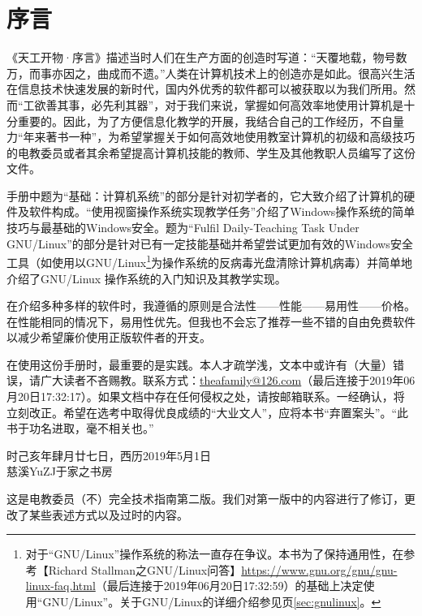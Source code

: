 \chapter{序言}
《天工开物·序言》描述当时人们在生产方面的创造时写道：“天覆地载，物号数万，而事亦因之，曲成而不遗。”人类在计算机技术上的创造亦是如此。很高兴生活在信息技术快速发展的新时代，国内外优秀的软件都可以被获取以为我们所用。然而“工欲善其事，必先利其器”，对于我们来说，掌握如何高效率地使用计算机是十分重要的。因此，为了方便信息化教学的开展，我结合自己的工作经历，不自量力“年来著书一种”，为希望掌握关于如何高效地使用教室计算机的初级和高级技巧的电教委员或者其余希望提高计算机技能的教师、学生及其他教职人员编写了这份文件。\par
手册中题为“基础：计算机系统”的部分是针对初学者的，它大致介绍了计算机的硬件及软件构成。“使用视窗操作系统实现教学任务”介绍了Windows操作系统的简单技巧与最基础的Windows安全。题为“Fulfil Daily-Teaching Task Under GNU/Linux”的部分是针对已有一定技能基础并希望尝试更加有效的Windows安全工具（如使用以GNU/Linux\footnote{对于“GNU/Linux”操作系统的称法一直存在争议。本书为了保持通用性，在参考【Richard Stallman之GNU/Linux问答】\url{https://www.gnu.org/gnu/gnu-linux-faq.html}（最后连接于2019年06月20日17:32:59）的基础上决定使用“GNU/Linux”。关于GNU/Linux的详细介绍参见\pageref{sec:gnulinux}页\ref{sec:gnulinux}。}为操作系统的反病毒光盘清除计算机病毒）并简单地介绍了GNU/Linux 操作系统的入门知识及其教学实现。\par
在介绍多种多样的软件时，我遵循的原则是合法性——性能——易用性——价格。在性能相同的情况下，易用性优先。但我也不会忘了推荐一些不错的自由免费软件以减少希望廉价使用正版软件者的开支。\par
在使用这份手册时，最重要的是实践。本人才疏学浅，文本中或许有（大量）错误，请广大读者不吝赐教。联系方式：\url{theafamily@126.com}（最后连接于2019年06月20日17:32:17）。如果文档中存在任何侵权之处，请按邮箱联系。一经确认，将立刻改正。希望在选考中取得优良成绩的“大业文人”，应将本书“弃置案头”。“此书于功名进取，毫不相关也。”\par
\begin{flushright}
时己亥年肆月廿七日，西历2019年5月1日\\
慈溪YuZJ于家之书房
\end{flushright}\par
这是电教委员（不）完全技术指南第二版。我们对第一版中的内容进行了修订，更改了某些表述方式以及过时的内容。
